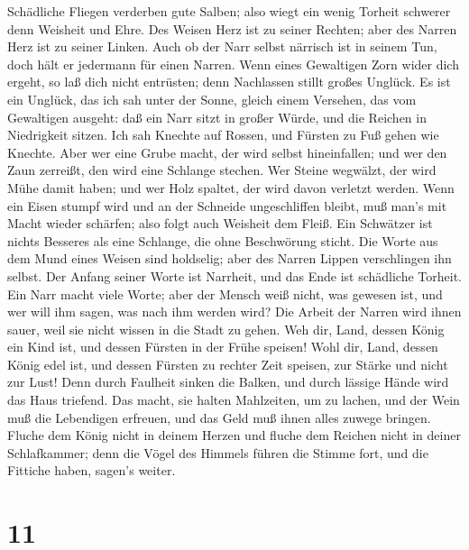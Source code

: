  Schädliche Fliegen verderben gute Salben; also wiegt ein
wenig Torheit schwerer denn Weisheit und Ehre.  Des Weisen
Herz ist zu seiner Rechten; aber des Narren Herz ist zu seiner Linken.
 Auch ob der Narr selbst närrisch ist in seinem Tun, doch
hält er jedermann für einen Narren.  Wenn eines Gewaltigen
Zorn wider dich ergeht, so laß dich nicht entrüsten; denn Nachlassen
stillt großes Unglück.  Es ist ein Unglück, das ich sah
unter der Sonne, gleich einem Versehen, das vom Gewaltigen ausgeht:
 daß ein Narr sitzt in großer Würde, und die Reichen in
Niedrigkeit sitzen.  Ich sah Knechte auf Rossen, und Fürsten
zu Fuß gehen wie Knechte.  Aber wer eine Grube macht, der
wird selbst hineinfallen; und wer den Zaun zerreißt, den wird eine
Schlange stechen.  Wer Steine wegwälzt, der wird Mühe damit
haben; und wer Holz spaltet, der wird davon verletzt werden.
 Wenn ein Eisen stumpf wird und an der Schneide
ungeschliffen bleibt, muß man's mit Macht wieder schärfen; also folgt
auch Weisheit dem Fleiß.  Ein Schwätzer ist nichts Besseres
als eine Schlange, die ohne Beschwörung sticht.  Die Worte
aus dem Mund eines Weisen sind holdselig; aber des Narren Lippen
verschlingen ihn selbst.  Der Anfang seiner Worte ist
Narrheit, und das Ende ist schädliche Torheit.  Ein Narr
macht viele Worte; aber der Mensch weiß nicht, was gewesen ist, und wer
will ihm sagen, was nach ihm werden wird?  Die Arbeit der
Narren wird ihnen sauer, weil sie nicht wissen in die Stadt zu gehen.
 Weh dir, Land, dessen König ein Kind ist, und dessen
Fürsten in der Frühe speisen!  Wohl dir, Land, dessen König
edel ist, und dessen Fürsten zu rechter Zeit speisen, zur Stärke und
nicht zur Lust!  Denn durch Faulheit sinken die Balken, und
durch lässige Hände wird das Haus triefend.  Das macht, sie
halten Mahlzeiten, um zu lachen, und der Wein muß die Lebendigen
erfreuen, und das Geld muß ihnen alles zuwege bringen. 
Fluche dem König nicht in deinem Herzen und fluche dem Reichen nicht in
deiner Schlafkammer; denn die Vögel des Himmels führen die Stimme fort,
und die Fittiche haben, sagen's weiter.

\hypertarget{section-10}{%
\section{11}\label{section-10}}

